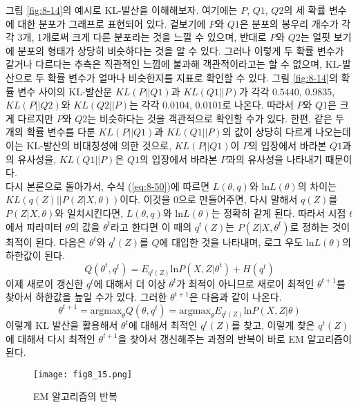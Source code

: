 \documentclass[a4paper]{oblivoir}
\begin{document}
그림 \ref{fig:8-14}의 예시로 KL-발산을 이해해보자. 여기에는 $P$, $Q1$, $Q2$의 세 확률 변수에 대한 분포가 그래프로 표현되어 있다. 겉보기에 $P$와 $Q1$은 분포의 봉우리 개수가 각각 3개, 1개로써 크게 다른 분포라는 것을 느낄 수 있으며, 반대로 $P$와 $Q2$는 얼핏 보기에 분포의 형태가 상당히 비슷하다는 것을 알 수 있다. 그러나 이렇게 두 확률 변수가 같거나 다르다는 추측은 직관적인 느낌에 불과해 객관적이라고는 할 수 없으며, KL-발산으로 두 확률 변수가 얼마나 비슷한지를 지표로 확인할 수 있다. 그림 \ref{fig:8-14}의 확률 변수 사이의 KL-발산운 $KL(P || Q1)$과 $KL(Q1 || P)$가 각각 $0.5440$, $0.9835$, $KL(P || Q2)$와 $KL(Q2 || P)$는 각각 $0.0104$, $0.0101$로 나온다. 따라서 $P$와 $Q1$은 크게 다르지만 $P$와 $Q2$는 비슷하다는 것을 객관적으로 확인할 수가 있다. 한편, 같은 두 개의 확률 변수를 다룬 $KL(P || Q1)$과 $KL(Q1 || P)$의 값이 상당히 다르게 나오는데 이는 KL-발산의 비대칭성에 의한 것으로, $KL(P || Q1)$이 $P$의 입장에서 바라본 $Q1$과의 유사성을, $KL(Q1 || P)$은 $Q1$의 입장에서 바라본 $P$과의 유사성을 나타내기 때문이다. \\

다시 본론으로 돌아가서, 수식 (\ref{eq:8-50})에 따르면 $L(\theta, q)$와 $\textrm{ln} L(\theta)$의 차이는 $KL(q(Z) || P(Z|X,\theta))$이다. 이것을 0으로 만들어주면, 다시 말해서 $q(Z)$를 $P(Z|X,\theta)$와 일치시킨다면, $L(\theta, q)$와 $\textrm{ln} L(\theta)$는 정확히 같게 된다. 따라서 시점 $t$에서 파라미터 $\theta$의 값을 $\theta^{t}$라고 한다면 이 때의 $q^{t}(Z)$는 $P(Z|X,\theta^t)$로 정하는 것이 최적이 된다. 다음은 $\theta^{t}$와 $q^{t}(Z)$를 $Q$에 대입한 것을 나타내며, 로그 우도 $\textrm{ln} L(\theta)$의 하한값이 된다.
\begin{equation}
Q(\theta^t, q^t) = E_{q^{t}(Z)} \textrm{ln} P(X, Z|\theta^t) + H(q^t) \label{eq:8-52}
\end{equation}
이제 새로이 갱신한 $q^t$에 대해서 더 이상 $\theta^{t}$가 최적이 아니므로 새로이 최적인 $\theta^{t+1}$를 찾아서 하한값을 높일 수가 있다. 그러한 $\theta^{t+1}$은 다음과 같이 나온다.  
\begin{equation}
\theta^{t+1} = \textrm{argmax}_{\theta} Q(\theta, q^t) = \textrm{argmax}_{\theta} E_{q^{t}(Z)} \textrm{ln} P(X, Z|\theta) \label{eq:8-53}
\end{equation}
이렇게 KL 발산을 활용해서 $\theta^{t}$에 대해서 최적인 $q^{t}(Z)$를 찾고, 이렇게 찾은 $q^{t}(Z)$에 대해서 다시 최적인 $\theta^{t+1}$을 찾아서 갱신해주는 과정의 반복이 바로 EM 알고리즘이 된다. \\

\begin{figure}[ht] \centering 
\texttt{[image: fig8\_15.png]} 
\caption{EM 알고리즘의 반복}
\label{fig:8-15}
\end{figure}
\end{document}
